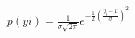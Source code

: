\documentclass[preview]{standalone}
\begin{document}
\begin{align*}
p(yi)=\frac{1}{\sigma \sqrt{2 \pi}} e^{-\frac{1}{2}\left(\frac{y_i-\mu}{\sigma}\right)^2}
\end{align*}
\end{document}
